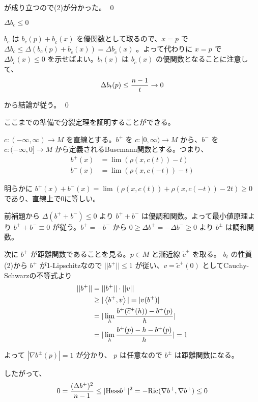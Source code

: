 \documentclass[dvipdfmx,a4paper]{jsreport}
\theoremstyle{definition}
\renewcommand{\tilde}{\widetilde}
\newcommand{\Ric}{{\rm Ric}}
\newcommand{\Hess}{{\rm Hess}}
\begin{document}
が成り立つので(2)が分かった。 \qed

\lem $\Delta b_c \leq 0$ 

\prf $b_c$ は $b_c(p)+b_{\tilde{c}}(x)$ を優関数として取るので、$x=p$ で $\Delta b_c \leq \Delta (b_c(p)+b_{\tilde{c}}(x))=\Delta b_{\tilde{c}}(x)$ 。よって代わりに $x=p$ で $\Delta b_{\tilde{c}}(x) \leq 0$ を示せばよい。$b_t(x)$ は $b_{\tilde{c}}(x)$ の優関数となることに注意して、
\begin{align*}
    \Delta b_t(p) \leq {n-1 \over t} \to 0
\end{align*}

から結論が従う。 \qed

ここまでの準備で分裂定理を証明することができる。

\prf $c:(-\infty,\infty) \to M$ を直線とする。$b^+$ を $c:[0,\infty) \to M$ から、$b^-$ を $c:(-\infty,0] \to M$ から定義されるBusemann関数とする。つまり、
\begin{align*}
    b^+(x) &= \lim (\rho(x,c(t))-t) \\
    b^-(x) &= \lim (\rho(x,c(-t))-t)
\end{align*}

明らかに $b^+(x)+b^-(x)=\lim (\rho(x,c(t))+\rho(x,c(-t))-2t) \geq 0$ であり、直線上で0に等しい。

前補題から $\Delta(b^+ +b^-) \leq 0$ より $b^+ + b^-$ は優調和関数。よって最小値原理より $b^++b^- \equiv 0$ が従う。$b^+=-b^-$ から $0 \geq \Delta b^+=-\Delta b^- \geq 0$ より $b^{\pm}$ は調和関数。

次に $b^+$ が距離関数であることを見る。$p \in M$ と漸近線 $\tilde{c}^+$ を取る。 $b_t$ の性質(2)から $b^+$ が1-Lipschitzなので $||b^+|| \leq 1$ が従い、$v=\dot{\tilde{c}^+}(0)$ としてCauchy-Schwarzの不等式より
\begin{align*}
    ||b^+|| &=||b^+|| \cdot ||v|| \\
    &\geq |\ev{b^+,v}| =|v(b^+)| \\
    &= |\lim_h {b^+(\tilde{c}^+(h))-b^+(p) \over h}| \\
    &= |\lim_h {b^+(p)-h-b^+(p) \over h}|=1
\end{align*}

よって $|\nabla b^{\pm}(p)|=1$ が分かり、 $p$ は任意なので $b^{\pm}$ は距離関数になる。

したがって、
\begin{align*}
    0={(\Delta b^+)^2 \over n-1} \leq |\Hess b^+|^2=-\Ric(\nabla b^+,\nabla b^+) \leq 0
\end{align*}
\end{document}
